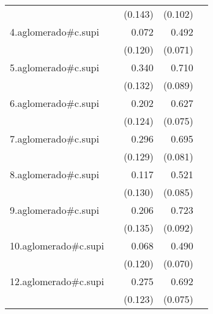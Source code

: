 {\begin{longtable}{l*{4}{D{.}{.}{-1}}}
            &                     &     (0.143)         &     (0.102)         &                     \\
\addlinespace
4.aglomerado#c.supi&                     &       0.072         &       0.492\sym{***}&                     \\
            &                     &     (0.120)         &     (0.071)         &                     \\
\addlinespace
5.aglomerado#c.supi&                     &       0.340\sym{*}  &       0.710\sym{***}&                     \\
            &                     &     (0.132)         &     (0.089)         &                     \\
\addlinespace
6.aglomerado#c.supi&                     &       0.202         &       0.627\sym{***}&                     \\
            &                     &     (0.124)         &     (0.075)         &                     \\
\addlinespace
7.aglomerado#c.supi&                     &       0.296\sym{*}  &       0.695\sym{***}&                     \\
            &                     &     (0.129)         &     (0.081)         &                     \\
\addlinespace
8.aglomerado#c.supi&                     &       0.117         &       0.521\sym{***}&                     \\
            &                     &     (0.130)         &     (0.085)         &                     \\
\addlinespace
9.aglomerado#c.supi&                     &       0.206         &       0.723\sym{***}&                     \\
            &                     &     (0.135)         &     (0.092)         &                     \\
\addlinespace
10.aglomerado#c.supi&                     &       0.068         &       0.490\sym{***}&                     \\
            &                     &     (0.120)         &     (0.070)         &                     \\
\addlinespace
12.aglomerado#c.supi&                     &       0.275\sym{*}  &       0.692\sym{***}&                     \\
            &                     &     (0.123)         &     (0.075)         &                     \\

\end{longtable}}

